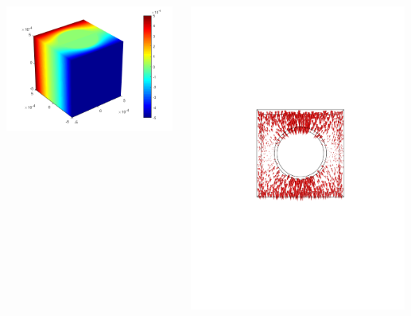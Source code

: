 \documentclass[compress]{beamer}
\begin{document}
\begin{frame}
{\begin{columns}[totalwidth=\textwidth]
\begin{column}{.45\textwidth}
   \includegraphics[width=0.99\textwidth]{Graphic/04_E1cylinelecpoten_3d}
   \end{column}
   \begin{column}{.35\textwidth}
   \centering
   \includegraphics[width=0.99\textwidth]{Graphic/04_E1cylinelecfield_XYview.pdf}
   \end{column}
\end{columns}}
\end{frame}
\end{document}
